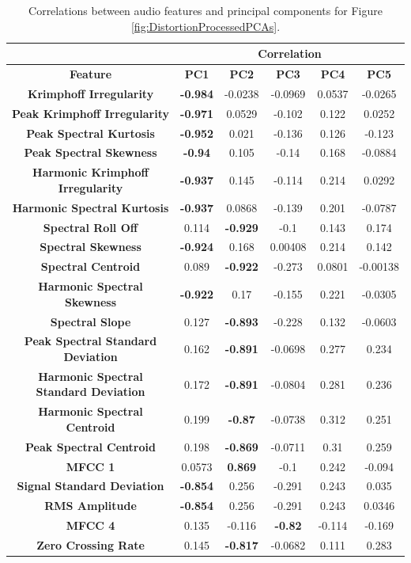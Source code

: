 		\begin{table}[h!]
			\centering
			\begin{tabular}{|c|c|c|c|c|c|}
				\cline{2-6}
				\multicolumn{1}{c|}{} & \multicolumn{5}{c|}{\bf{Correlation}} \tabularnewline
				\hline
				\bf{Feature} & \bf{PC1} & \bf{PC2} & \bf{PC3} & \bf{PC4} & \bf{PC5} \tabularnewline
				\hline
				\hline
				\bf{Krimphoff Irregularity} & \bf{-0.984} & -0.0238 & -0.0969 & 0.0537 & -0.0265 \tabularnewline
				\hline
				\bf{Peak Krimphoff Irregularity} & \bf{-0.971} & 0.0529 & -0.102 & 0.122 & 0.0252 \tabularnewline
				\hline
				\bf{Peak Spectral Kurtosis} & \bf{-0.952} & 0.021 & -0.136 & 0.126 & -0.123 \tabularnewline
				\hline
				\bf{Peak Spectral Skewness} & \bf{-0.94} & 0.105 & -0.14 & 0.168 & -0.0884 \tabularnewline
				\hline
				\bf{Harmonic Krimphoff Irregularity} & \bf{-0.937} & 0.145 & -0.114 & 0.214 & 0.0292 \tabularnewline
				\hline
				\bf{Harmonic Spectral Kurtosis} & \bf{-0.937} & 0.0868 & -0.139 & 0.201 & -0.0787 \tabularnewline
				\hline
				\bf{Spectral Roll Off} & 0.114 & \bf{-0.929} & -0.1 & 0.143 & 0.174 \tabularnewline
				\hline
				\bf{Spectral Skewness} & \bf{-0.924} & 0.168 & 0.00408 & 0.214 & 0.142 \tabularnewline
				\hline
				\bf{Spectral Centroid} & 0.089 & \bf{-0.922} & -0.273 & 0.0801 & -0.00138 \tabularnewline
				\hline
				\bf{Harmonic Spectral Skewness} & \bf{-0.922} & 0.17 & -0.155 & 0.221 & -0.0305 \tabularnewline
				\hline
				\bf{Spectral Slope} & 0.127 & \bf{-0.893} & -0.228 & 0.132 & -0.0603 \tabularnewline
				\hline
				\bf{Peak Spectral Standard Deviation} & 0.162 & \bf{-0.891} & -0.0698 & 0.277 & 0.234 \tabularnewline
				\hline
				\bf{Harmonic Spectral Standard Deviation} & 0.172 & \bf{-0.891} & -0.0804 & 0.281 & 0.236 \tabularnewline
				\hline
				\bf{Harmonic Spectral Centroid} & 0.199 & \bf{-0.87} & -0.0738 & 0.312 & 0.251 \tabularnewline
				\hline
				\bf{Peak Spectral Centroid} & 0.198 & \bf{-0.869} & -0.0711 & 0.31 & 0.259 \tabularnewline
				\hline
				\bf{MFCC 1} & 0.0573 & \bf{0.869} & -0.1 & 0.242 & -0.094 \tabularnewline
				\hline
				\bf{Signal Standard Deviation} & \bf{-0.854} & 0.256 & -0.291 & 0.243 & 0.035 \tabularnewline
				\hline
				\bf{RMS Amplitude} & \bf{-0.854} & 0.256 & -0.291 & 0.243 & 0.0346 \tabularnewline
				\hline
				\bf{MFCC 4} & 0.135 & -0.116 & \bf{-0.82} & -0.114 & -0.169 \tabularnewline
				\hline
				\bf{Zero Crossing Rate} & 0.145 & \bf{-0.817} & -0.0682 & 0.111 & 0.283 \tabularnewline
				\hline
			\end{tabular}
			\caption{Correlations between audio features and principal components for Figure
				 \ref{fig:DistortionProcessedPCAs}.}
			\label{fig:DistortionProcessedCorrelations}
		\end{table}

